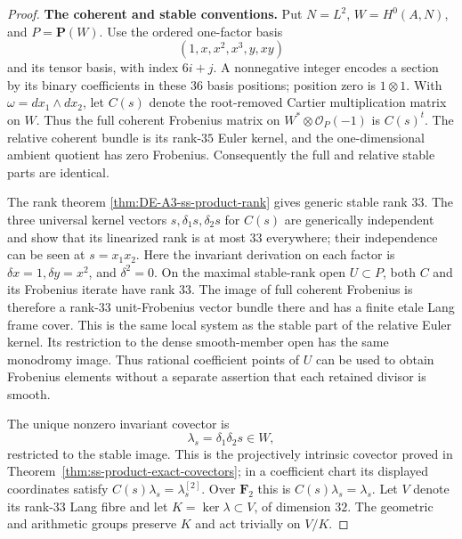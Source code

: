 \begin{proof}
\par\smallskip\noindent\textbf{The coherent and stable conventions.}
Put $N=L^2$, $W=H^0(A,N)$, and $P=\mathbf P(W)$.
Use the ordered one-factor basis
\[
             (1,x,x^2,x^3,y,xy)
\]
and its tensor basis, with index $6i+j$.
A nonnegative integer encodes a section by its binary coefficients in
these $36$ basis positions; position zero is $1\otimes1$.
With $\omega=dx_1\wedge dx_2$, let $C(s)$ denote the root-removed Cartier
multiplication matrix on $W$. Thus the full coherent Frobenius matrix
on $W^*\otimes\mathcal O_P(-1)$ is $C(s)^t$.
The relative coherent bundle is its rank-$35$ Euler kernel, and the
one-dimensional ambient quotient has zero Frobenius. Consequently the
full and relative stable parts are identical.

The rank theorem \ref{thm:DE-A3-ss-product-rank} gives generic stable rank
$33$. The three universal kernel vectors
$s,\delta_1s,\delta_2s$ for $C(s)$ are generically independent and show
that its linearized rank is at most $33$ everywhere; their independence
can be seen at $s=x_1x_2$. Here the invariant derivation on each factor is
$\delta x=1,\delta y=x^2$, and $\delta^2=0$.
On the maximal stable-rank open $U\subset P$, both $C$ and its Frobenius
iterate have rank $33$. The image of full coherent Frobenius is therefore
a rank-$33$ unit-Frobenius vector bundle there and has a finite etale Lang
frame cover. This is the same local system as the stable part of the
relative Euler kernel. Its restriction to the dense smooth-member open
has the same monodromy image. Thus rational coefficient points of $U$
can be used to obtain Frobenius elements without a separate assertion
that each retained divisor is smooth.

The unique nonzero invariant covector is
\[
                       \lambda_s=\delta_1\delta_2s\in W,
\]
restricted to the stable image. This is the projectively intrinsic
covector proved in Theorem~\ref{thm:ss-product-exact-covectors}; in a
coefficient chart its displayed coordinates satisfy
$C(s)\lambda_s=\lambda_s^{[2]}$.
Over $\mathbf F_2$ this is $C(s)\lambda_s=\lambda_s$.
Let $V$ denote its rank-$33$ Lang fibre and let
$K=\ker\lambda\subset V$, of dimension $32$.
The geometric and arithmetic groups preserve $K$ and act trivially on
$V/K$.


\end{proof}
